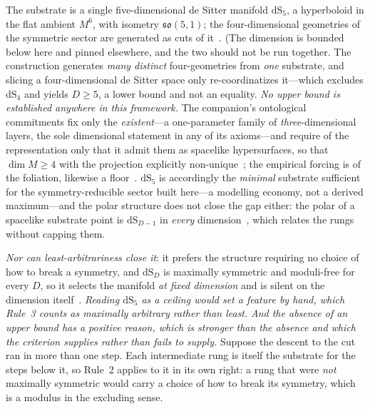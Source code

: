 \documentclass[11pt,a4paper]{article}
\theoremstyle{plain}
\theoremstyle{definition}
\theoremstyle{remark}
\newcommand{\so}{\mathfrak{so}}
\newcommand{\dS}{\mathrm{dS}}
\begin{document}
The substrate is a single five-dimensional de Sitter manifold $\dS_5$, a hyperboloid in the flat ambient $M^6$, with isometry $\so(5,1)$; the four-dimensional geometries of the symmetric sector are generated as cuts of it~\cite{JanzenOperator,JanzenSlicing}. (The dimension is bounded below here and pinned elsewhere, and the two should not be run together. The
construction generates \emph{many distinct} four-geometries from \emph{one} substrate, and slicing a
four-dimensional de Sitter space only re-coordinatizes it---which excludes $\dS_4$ and yields $D\ge5$, a lower
bound and not an equality. \emph{No upper bound is established anywhere in this framework.} The companion's
ontological commitments fix only the \emph{existent}---a one-parameter family of \emph{three}-dimensional
layers, the sole dimensional statement in any of its axioms---and require of the representation only that it
admit them as spacelike hypersurfaces, so that $\dim M\ge4$ with the projection explicitly
non-unique~\cite{JanzenCRframework}; the empirical forcing is of the foliation, likewise a
floor~\cite{JanzenModernParallax}. $\dS_5$ is accordingly the \emph{minimal} substrate sufficient for the
symmetry-reducible sector built here---a modelling economy, not a derived maximum---and the polar structure
does not close the gap either: the polar of a spacelike substrate point is $\dS_{D-1}$ in \emph{every}
dimension~\cite{JanzenGeometricCore}, which relates the rungs without capping
them. 

\emph{Nor can least-arbitrariness close it}: it prefers the structure requiring
no choice of how to break a symmetry, and $\dS_D$ is maximally symmetric and moduli-free for every $D$, so it
selects the manifold \emph{at fixed dimension} and is silent on the dimension
itself~\cite{JanzenShadowExistence}. \emph{Reading $\dS_5$ as a ceiling would set a feature by hand, which
Rule~3 counts as maximally arbitrary rather than least.} \emph{And the absence of an upper bound
has a positive reason, which is stronger than the absence and which the criterion supplies rather than
fails to supply.} Suppose the
descent to the cut ran in more than one step. Each intermediate rung is itself the substrate for the
steps below it, so Rule~2 applies to it in its own right: a rung that were \emph{not} maximally
symmetric would carry a choice of how to break its symmetry, which is a modulus in the excluding
sense. 
\end{document}

